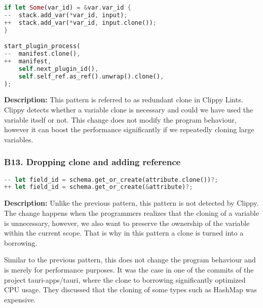 \begin{lstlisting}[language=Rust, style=colouredRust, label={l3}]
if let Some(var_id) = &var.var_id {
--  stack.add_var(*var_id, input);
++  stack.add_var(*var_id, input.clone());
}

start_plugin_process(
--  manifest.clone(),
++  manifest,
    self.next_plugin_id(),
    self.self_ref.as_ref().unwrap().clone(),
);

\end{lstlisting}

\noindent \textbf{Description:} This pattern is referred to as redundant clone in Clippy Lints. Clippy detects whether a variable clone is necessary and could we have used the variable itself or not. This change does not modify the program behaviour, however it can boost the performance significantly if we repeatedly cloning large variables. 

\subsubsection{B13. Dropping clone and adding reference}

\begin{lstlisting}[language=Rust, style=colouredRust, label={l3}]
-- let field_id = schema.get_or_create(attribute.clone())?;
++ let field_id = schema.get_or_create(&attribute)?;
\end{lstlisting}

\noindent \textbf{Description:} Unlike the previous pattern, this pattern is not detected by Clippy. The change happens when the programmers realizes that the cloning of a variable is unnecessary, however, we also want to preserve the ownership of the variable within the current scope. That is why in this pattern a clone is turned into a borrowing. 

Similar to the previous pattern, this does not change the program behaviour and is merely for performance purposes. It was the case in one of the commits of the project tauri-apps/tauri, where the clone to borrowing significantly optimized CPU usage. They discussed that the cloning of some types such as HashMap was expensive.



